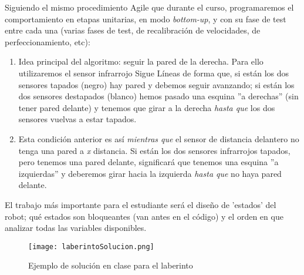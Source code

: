 \begin{description}
	Siguiendo el mismo procedimiento Agile que durante el curso, programaremos el \break comportamiento en etapas unitarias, en modo \textit{bottom-up}, y con su fase de test entre cada una (varias fases de test, de recalibración de velocidades, de perfeccionamiento, etc):
	\begin{enumerate}
		\item Idea principal del algoritmo: seguir la pared de la derecha. Para ello utilizaremos el sensor infrarrojo Sigue Líneas de forma que, si están los dos sensores tapados (negro) hay pared y debemos seguir avanzando; si están los dos sensores destapados (blanco) hemos pasado una esquina ''a derechas'' (sin tener pared delante) y tenemos que girar a la derecha \textit{hasta que} los dos sensores vuelvas a estar tapados.
		\item Esta condición anterior es así \textit{mientras que} el sensor de distancia delantero no tenga una pared a \textit{x} distancia. Si están los dos sensores infrarrojos tapados, pero tenemos una pared delante, significará que tenemos una esquina ''a izquierdas'' y deberemos girar hacia la izquierda \textit{hasta que} no haya pared delante.
		
	\end{enumerate}
	El trabajo más importante para el estudiante será el diseño de 'estados' del robot; qué estados son bloqueantes (van antes en el código) y el orden en que analizar todas las variables disponibles.
	
	\begin{figure}[H]
		\texttt{[image: laberintoSolucion.png]}
		\centering
		\label{img:laberintoSolucion}
		\caption{Ejemplo de solución en clase para el laberinto}
	\end{figure}
	

\end{description}
